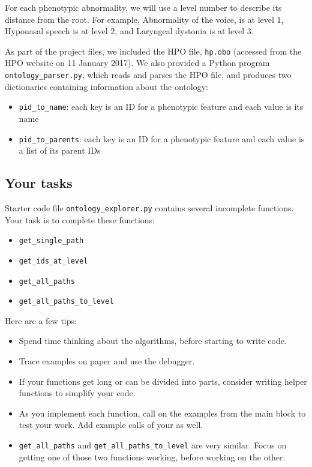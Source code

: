 \documentclass[a4paper]{article}
\begin{document}
For each phenotypic abnormality, we will use a level number to describe its distance from the root.  For example, Abnormality of the voice, is at level 1, Hyponasal speech is at level 2, and Laryngeal dystonia is at level 3.

As part of the project files, we included the HPO file, \texttt{hp.obo} (accessed from the HPO website on 11 January 2017).  We also provided a Python program \texttt{ontology\_parser.py}, which reads and parses the HPO file, and produces two dictionaries containing information about the ontology:

\begin{itemize}
\item \texttt{pid\_to\_name}: each key is an ID for a phenotypic feature and each value is its name
\item \texttt{pid\_to\_parents}: each key is an ID for a phenotypic feature and each value is a list of its parent IDs
\end{itemize}

\subsection{Your tasks}

Starter code file \texttt{ontology\_explorer.py} contains several incomplete functions.  Your task is to complete these functions:
\begin{itemize}
\item \verb|get_single_path|
\item \verb|get_ids_at_level|
\item \verb|get_all_paths|
\item \verb|get_all_paths_to_level| \end{itemize}

\noindent Here are a few tips:
\begin{itemize}
\item Spend time thinking about the algorithms, before starting to write code.  
\item Trace examples on paper and use the debugger.
\item If your functions get long or can be divided into parts, consider writing helper functions to simplify your code.
\item As you implement each function, call on the examples from the main block to test your work.  Add example calls of your as well.
\item \verb|get_all_paths| and \verb|get_all_paths_to_level| are very similar.  Focus on getting one of those two functions working, before working on the other.
\end{itemize}
\end{document}
